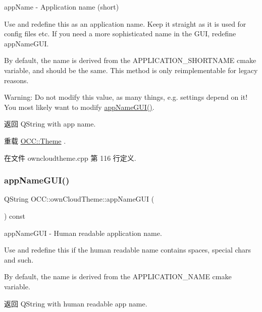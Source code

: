 app\+Name -\/ Application name (short) 

Use and redefine this as an application name. Keep it straight as it is used for config files etc. If you need a more sophisticated name in the G\+UI, redefine app\+Name\+G\+UI.

By default, the name is derived from the A\+P\+P\+L\+I\+C\+A\+T\+I\+O\+N\+\_\+\+S\+H\+O\+R\+T\+N\+A\+ME cmake variable, and should be the same. This method is only reimplementable for legacy reasons.

Warning\+: Do not modify this value, as many things, e.\+g. settings depend on it! You most likely want to modify \hyperlink{class_o_c_c_1_1own_cloud_theme_ae4d6581e7332b009cfd6445bd23a9b95}{app\+Name\+G\+U\+I()}.

\begin{DoxyReturn}{返回}
Q\+String with app name. 
\end{DoxyReturn}


重载 \hyperlink{class_o_c_c_1_1_theme_a08bc5c6b79f6680e58c4b3eebe7cad77}{O\+C\+C\+::\+Theme} .



在文件 owncloudtheme.\+cpp 第 116 行定义.

\mbox{\label{class_o_c_c_1_1own_cloud_theme_ae4d6581e7332b009cfd6445bd23a9b95}} 
\subsubsection{\texorpdfstring{app\+Name\+G\+U\+I()}{appNameGUI()}}
{\footnotesize\ttfamily Q\+String O\+C\+C\+::own\+Cloud\+Theme\+::app\+Name\+G\+UI (\begin{DoxyParamCaption}{ }\end{DoxyParamCaption}) const\hspace{0.3cm}{\ttfamily [virtual]}}



app\+Name\+G\+UI -\/ Human readable application name. 

Use and redefine this if the human readable name contains spaces, special chars and such.

By default, the name is derived from the A\+P\+P\+L\+I\+C\+A\+T\+I\+O\+N\+\_\+\+N\+A\+ME cmake variable.

\begin{DoxyReturn}{返回}
Q\+String with human readable app name. 
\end{DoxyReturn}


